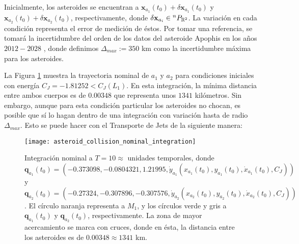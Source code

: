 Inicialmente, los asteroides se encuentran a $\mathbf{x}_{a_1}(t_0) + \delta\mathbf{x}_{a_1}(t_0)$  y $\mathbf{x}_{a_2}(t_0) + \delta\mathbf{x}_{a_2}(t_0)$, respectivamente, donde $\delta\mathbf{x}_{a_i} \in {^{n}P_{\mathbb{R}^ 2} }$. La variación en cada condición representa el error de medición de éstos. Por tomar una referencia, se tomará la incertidumbre del orden de los datos del asteroide Apophis en los años $2012 - 2028$ \cite{Desmars2013}, donde definimos $\Delta_{max} := 350 $ km como la incertidumbre máxima para los asteroides.

La Figura \ref{fig:asteroid_collision_nominal_integration} muestra la trayectoria nominal de $a_1$ y $a_2$ para condiciones iniciales con energía $C_J = -1.81252 < C_J(L_1)$. En esta integración, la mínima distancia entre ambos cuerpos es de $0.00348$ que representa unos $1341$ kilómetros. Sin embargo, aunque para esta condición particular los asteroides no chocan, es posible que sí lo hagan dentro de una integración con variación hasta de radio $\Delta_{max}$. Esto se puede hacer con el Transporte de Jets de la siguiente manera: 

\begin{figure}
 \centering
 \texttt{[image: asteroid\_collision\_nominal\_integration]}
 \caption{Integración nominal a $T=10 \approx $ unidades temporales, donde $\mathbf{q}_{a_1}(t_0) = \left( -0.373098, -0.0804321, 1.21995, \dot{y}_{a_1} \left( x_{a_1}(t_0), y_{a_1}(t_0), \dot{x}_{a_1}(t_0), C_J \right) \right)$ 
 y $\mathbf{q}_{a_2}(t_0) = \left( -0.27324, -0.307896, -0.307576, \dot{y}_{a_2} \left( x_{a_2}(t_0), y_{a_2}(t_0), \dot{x}_{a_2}(t_0), C_J \right) \right)$. El círculo naranja representa a $M_1$, y los círculos verde y gris a $\mathbf{q}_{a_1}(t_0)$ y $\mathbf{q}_{a_2}(t_0)$, respectivamente. La zona de mayor acercamiento se marca con cruces, donde en ésta, la distancia entre los asteroides es de $0.00348 \approx 1341$ km.}
 \label{fig:asteroid_collision_nominal_integration}
\end{figure}


